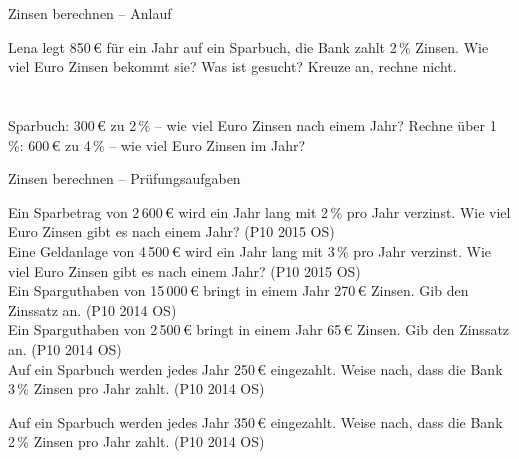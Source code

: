 \setcounter{aufgabe}{34}

\begin{aufgabe}{Zinsen berechnen – Anlauf}
\begin{teile}
\teil Lena legt 850\,€ für ein Jahr auf ein Sparbuch, die Bank zahlt 2\,\% Zinsen. Wie viel Euro Zinsen bekommt sie? Was ist gesucht? Kreuze an, rechne nicht. \\  \\  \\ 
\teil Sparbuch: 300\,€ zu 2\,\% – wie viel Euro Zinsen nach einem Jahr? \leerfeld[€]
\teil Rechne über 1\,\%: 600\,€ zu 4\,\% – wie viel Euro Zinsen im Jahr? \leerfeld[€]
\end{teile}
\end{aufgabe}

\begin{aufgabe}{Zinsen berechnen – Prüfungsaufgaben}
\begin{teile}
\teil Ein Sparbetrag von 2\,600\,€ wird ein Jahr lang mit 2\,\% pro Jahr verzinst. Wie viel Euro Zinsen gibt es nach einem Jahr? \hfill (P10 2015 OS) \\ \leerfeld[€]
\teil Eine Geldanlage von 4\,500\,€ wird ein Jahr lang mit 3\,\% pro Jahr verzinst. Wie viel Euro Zinsen gibt es nach einem Jahr? \hfill (P10 2015 OS) \\ \leerfeld[€]
\teil Ein Sparguthaben von 15\,000\,€ bringt in einem Jahr 270\,€ Zinsen. Gib den Zinssatz an. \hfill (P10 2014 OS) \\ \leerfeld[\%]
\teil Ein Sparguthaben von 2\,500\,€ bringt in einem Jahr 65\,€ Zinsen. Gib den Zinssatz an. \hfill (P10 2014 OS) \\ \leerfeld[\%]
\teil Auf ein Sparbuch werden jedes Jahr 250\,€ eingezahlt. Weise nach, dass die Bank 3\,\% Zinsen pro Jahr zahlt. \hfill (P10 2014 OS)

\teil Auf ein Sparbuch werden jedes Jahr 350\,€ eingezahlt. Weise nach, dass die Bank 2\,\% Zinsen pro Jahr zahlt. \hfill (P10 2014 OS)

\end{teile}
\end{aufgabe}

